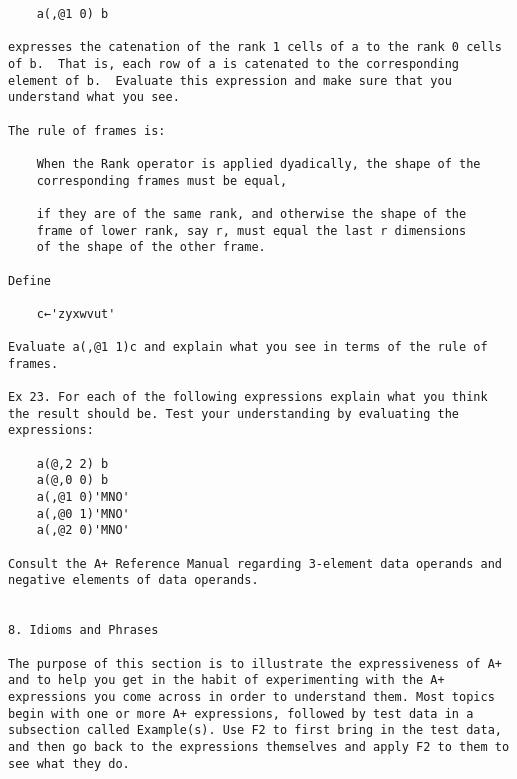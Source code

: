 \documentclass{article}
\begin{document}
\begin{verbatim}
	a(,@1 0) b                                                           

expresses the catenation of the rank 1 cells of a to the rank 0 cells 
of b.  That is, each row of a is catenated to the corresponding       
element of b.  Evaluate this expression and make sure that you        
understand what you see.                                              

The rule of frames is:                                                

	When the Rank operator is applied dyadically, the shape of the       
	corresponding frames must be equal,                                   

	if they are of the same rank, and otherwise the shape of the 
	frame of lower rank, say r, must equal the last r dimensions 
	of the shape of the other frame.               

Define                                                               

	c←'zyxwvut'                                                          

Evaluate a(,@1 1)c and explain what you see in terms of the rule of   
frames.                                                               

Ex 23. For each of the following expressions explain what you think   
the result should be. Test your understanding by evaluating the       
expressions:                                                          

	a(@,2 2) b                                                           
	a(@,0 0) b                                                           
	a(,@1 0)'MNO'                                                        
	a(,@0 1)'MNO'                                                        
	a(,@2 0)'MNO'                                                        

Consult the A+ Reference Manual regarding 3-element data operands and 
negative elements of data operands.                                   


8. Idioms and Phrases                                                 

The purpose of this section is to illustrate the expressiveness of A+ 
and to help you get in the habit of experimenting with the A+         
expressions you come across in order to understand them. Most topics  
begin with one or more A+ expressions, followed by test data in a     
subsection called Example(s). Use F2 to first bring in the test data, 
and then go back to the expressions themselves and apply F2 to them to
see what they do.                                                     



\end{verbatim}
\end{document}
